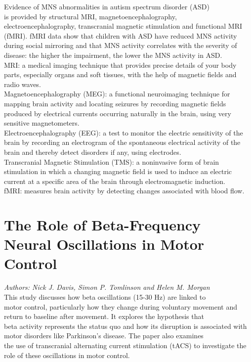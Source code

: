 \documentclass[12pt]{article}
\begin{document}
\noindent Evidence of MNS abnormalities in autism spectrum disorder (ASD)\\is provided by structural MRI, magnetoencephalography,\\ electroencephalography, transcranial magnetic stimulation and functional MRI (fMRI). fMRI data show that children with ASD have reduced MNS activity during social mirroring and that MNS activity correlates with the severity of disease: the higher the impairment, the lower the MNS activity in ASD.\\

\noindent MRI: a medical imaging technique that provides precise details of your body parts, especially organs and soft tissues, with the help of magnetic fields and radio waves.\\

\noindent Magnetoencephalography (MEG): a functional neuroimaging technique for mapping brain activity and locating seizures by recording magnetic fields produced by electrical currents occurring naturally in the brain, using very sensitive magnetometers.\\

\noindent Electroencephalography (EEG): a test to monitor the electric sensitivity of the brain by recording an electrogram of the spontaneous electrical activity of the brain and thereby detect disorders if any, using electrodes.\\

\noindent Transcranial Magnetic Stimulation (TMS): a noninvasive form of brain stimulation in which a changing magnetic field is used to induce an electric current at a specific area of the brain through electromagnetic induction.\\

\noindent fMRI: measures brain activity by detecting changes associated with blood flow.

\section{The Role of Beta-Frequency\\Neural Oscillations in Motor Control}
\textit{Authors: Nick J. Davis, Simon P. Tomlinson and Helen M. Morgan}\\
This study discusses how beta oscillations (15-30 Hz) are linked to\\motor control, particularly how they change during voluntary movement and return to baseline after movement. It explores the hypothesis that\\beta activity represents the status quo and how its disruption is associated with motor disorders like Parkinson’s disease. The paper also examines\\the use of transcranial alternating current stimulation (tACS) to investigate the role of these oscillations in motor control.\\
\end{document}
